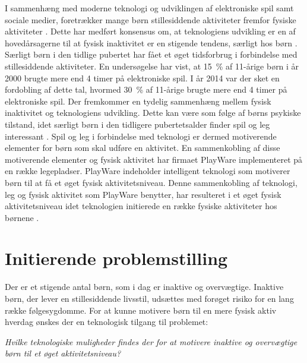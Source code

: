 I sammenhæng med moderne teknologi og udviklingen af elektroniske spil samt sociale medier, foretrækker mange børn stillesiddende aktiviteter fremfor fysiske aktiviteter \citep{Universitet2014}. Dette har medført konsensus om, at teknologiens udvikling er en af hovedårsagerne til at fysisk inaktivitet er en stigende tendens, særligt hos børn \citep{Kiens2007}. \newline
Særligt børn i den tidlige pubertet har fået et øget tidsforbrug i forbindelse med stillesiddende aktiviteter. En undersøgelse har vist, at 15~\% af 11-årige børn i år 2000 brugte mere end 4 timer på elektroniske spil. I år 2014 var der sket en fordobling af dette tal, hvormed 30~\% af 11-årige brugte mere end 4 timer på elektroniske spil. \citep{Universitet2014} \newline
Der fremkommer en tydelig sammenhæng mellem fysisk inaktivitet og teknologiens udvikling. Dette kan være som følge af børns psykiske tilstand, idet særligt børn i den tidligere pubertetsalder finder spil og leg interessant \citep{Wied2011}. Spil og leg i forbindelse med teknologi er dermed motiverende elementer for børn som skal udføre en aktivitet. En sammenkobling af disse motiverende elementer og fysisk aktivitet har firmaet PlayWare implementeret på en række legepladser. PlayWare indeholder intelligent teknologi som motiverer børn til at få et øget fysisk aktivitetsniveau. Denne sammenkobling af teknologi, leg og fysisk aktivitet som PlayWare benytter, har resulteret i et øget fysisk aktivitetsniveau idet teknologien initierede en række fysiske aktiviteter hos børnene \citep{Rishoej2010}. 

\section{Initierende problemstilling}
Der er et stigende antal børn, som i dag er inaktive og overvægtige. Inaktive børn, der lever en stillesiddende livsstil, udsættes med forøget risiko for en lang række følgesygdomme. For at kunne motivere børn til en mere fysisk aktiv hverdag ønskes der en teknologisk tilgang til problemet:

\begin{center}
\textit{Hvilke teknologiske muligheder findes der for at motivere inaktive og overvægtige børn til et øget aktivitetsniveau?}
\end{center}